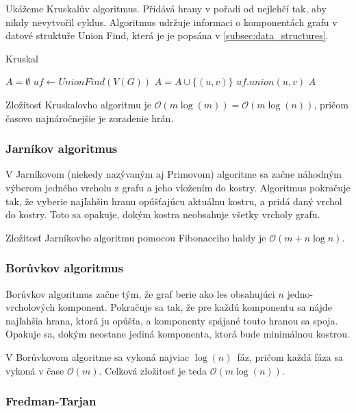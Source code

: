 Ukážeme Kruskalův algoritmus. Přidává hrany v pořadí od nejlehčí tak,
aby nikdy nevytvořil cyklus.
Algoritmus udržuje informaci o komponentách grafu v datové struktuře
Union Find, která je je popsána v
\autoref{subsec:data_structures}.

\begin{algorithm}
\caption{Kruskal}
\begin{algorithmic}[1]
    \State $A = \emptyset$
    \State $uf \gets UnionFind(V(G))$
            \State $A = A \cup \{(u,v)\}$
            \State $uf.union(u, v)$
        \EndIf
    \EndFor
    \State \Return $A$
\EndFunction
\end{algorithmic}
\end{algorithm}

Zložitosť Kruskalovho algoritmu je $\mathcal{O}(m \log(m))=\mathcal{O}(m \log(n))$, pričom
časovo najnáročnejšie je zoradenie hrán.

\subsubsection*{Jarníkov algoritmus}

V Jarníkovom (niekedy nazývaným aj Primovom) algoritme sa začne
náhodným výberom jedného vrcholu z grafu a jeho vložením do kostry.
Algoritmus pokračuje tak, že vyberie najľahšiu hranu opúšťajúcu
aktuálnu kostru, a pridá daný vrchol do kostry. Toto sa opakuje,
dokým kostra neobsahuje všetky vrcholy grafu.

Zložitosť Jarníkovho algoritmu pomocou Fibonacciho haldy
 je $\mathcal{O}(m + n \log n)$.

\subsubsection*{Borůvkov algoritmus}

Borůvkov algoritmus začne tým, že graf berie ako les obsahujúci
$n$ jedno-vrcholových komponent. Pokračuje sa tak, že pre každú
komponentu sa nájde najľahšia hrana, ktorá ju opúšťa, a komponenty
spájané touto hranou sa spoja. Opakuje sa, dokým neostane jediná 
komponenta, ktorá bude minimálnou kostrou.

V Borůvkovom algoritme sa vykoná najviac $\log(n)$~fáz, pričom
každá fáza sa vykoná v čase $\mathcal{O}(m)$. Celková zložitosť
je teda $\mathcal{O}(m \log(n))$.

\subsubsection*{Fredman-Tarjan}

